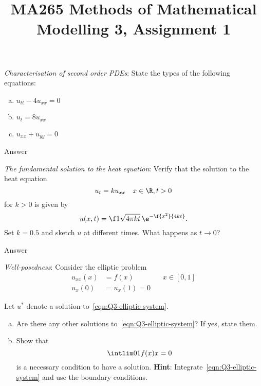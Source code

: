 \documentclass[a4paper]{article}
\title{MA265 Methods of Mathematical Modelling 3, Assignment 1}
\begin{document}
\maketitle

\setlength{\parindent}{0em}
\setlength{\parskip}{1em}


\begin{questionbody}
\textit{Characterisation of second order PDEs}: State the types of the following equations:
\begin{enumerate}[(a)]
\item $u_{tt} - 4 u_{xx} = 0$
\item $u_t = 8 u_{xx}$
\item $u_{xx} + u_{yy} = 0$
\end{enumerate}
\end{questionbody}

Answer



\begin{questionbody}
\textit{The fundamental solution to the heat equation}: Verify that the solution to the heat equation \begin{equation}
u_t = k u_{xx} \quad x \in \R, t > 0
\label{eqn:heat-equation}
\end{equation}
for $k > 0$ is given by \[
u(x, t) = \f1{\sqrt{4 \pi kt}} \, \e^{-\f{x^2}{4 kt}}.
\] Set $k = 0.5$ and sketch $u$ at different times. What happens as $t \to 0$?
\end{questionbody}

Answer



\begin{questionbody}
\textit{Well-posedness}: Consider the elliptic problem \begin{align*}
u_{xx}(x) &= f(x) \qquad\qquad x \in [0, 1] \tag{\dagger}\label{eqn:Q3-elliptic-system} \\
u_x(0) &= u_x(1) = 0
\end{align*}

Let $u^*$ denote a solution to~\eqref{eqn:Q3-elliptic-system}.
\begin{enumerate}[(a)]
\item Are there any other solutions to~\eqref{eqn:Q3-elliptic-system}? If yes, state them.
\item Show that \[ \intlim 0 1 {f(x)} x = 0 \] is a necessary condition to have a solution. \textbf{Hint}: Integrate~\eqref{eqn:Q3-elliptic-system} and use the boundary conditions.
\end{enumerate}
\end{questionbody}
\end{document}
